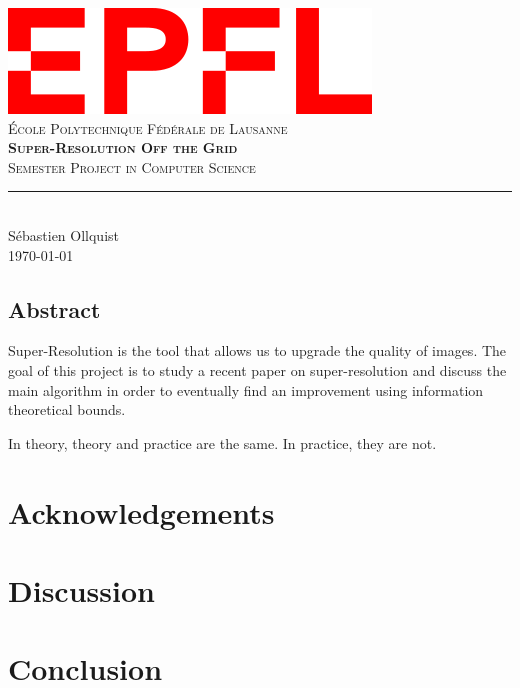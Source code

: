 \documentclass[11pt,titlepage]{report}
\begin{document}
\begin{titlepage}
	\centering
    \includegraphics[width=0.5\linewidth]{images/EPFL.png}\\[0.25cm] 	%
    \textsc{\LARGE École Polytechnique Fédérale de Lausanne}\\ \vspace{\fill}
    \textbf{\textsc{\fontsize{30}{30}\selectfont Super-Resolution Off the Grid}}\\ \vspace{\fill}		
	\textsc{\LARGE Semester Project in Computer Science}\\[0.4cm]
	\rule{\linewidth}{0.2 mm} \\[0.5 cm]
	Sébastien Ollquist \\[2cm] \today
\end{titlepage}
\restoregeometry

\thispagestyle{numberonly}
\begin{summary}
\section*{Abstract}
Super-Resolution is the tool that allows us to upgrade the quality of images. The goal of this project is to study a recent paper on super-resolution and discuss the main algorithm in order to eventually find an improvement using information theoretical bounds.
\end{summary}

\begin{fquote}
    In theory, theory and practice are the same. In practice, they are not.
\end{fquote}
\newpage
\chapter*{Acknowledgements}
\newpage

\tableofcontents






\chapter{Discussion}

\chapter{Conclusion}

\printbibliography

\appendix


\clearpage
\pagestyle{numberonly}
\end{document}
